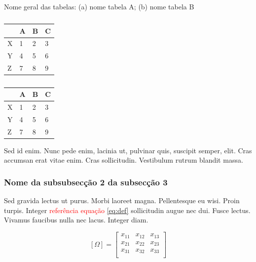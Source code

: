 \begin{table}[h]
    \centering
    \caption{Nome geral das tabelas: (a) nome tabela A; (b) nome tabela B}
    \begin{subtable}[h]{0.4\textwidth}
        \centering
        \caption{}
        \begin{tabular}{llll}
            \hline
              & A & B & C \\
            \hline
           X  & 1 & 2 & 3 \\
           Y  & 4 & 5 & 6 \\
           Z  & 7 & 8 & 9 \\
            \hline
        \end{tabular}
        \label{tab:tabA}
    \end{subtable}
    \begin{subtable}[h]{0.4\textwidth}
        \centering
        \caption{}
        \begin{tabular}{llll}
            \hline
              & A & B & C \\
            \hline
           X  & 1 & 2 & 3 \\
           Y  & 4 & 5 & 6 \\
           Z  & 7 & 8 & 9 \\
            \hline
        \end{tabular}
        \label{tab:tabB}
    \end{subtable}
    \label{tab:tabAB}
\end{table}

Sed id enim. Nunc pede enim, lacinia ut, pulvinar quis, suscipit semper, elit. Cras accumsan erat vitae enim. Cras sollicitudin. Vestibulum rutrum blandit massa.

\subsubsection{Nome da subsubsecção 2 da subsecção 3}
Sed gravida lectus ut purus. Morbi laoreet magna. Pellentesque eu wisi. Proin turpis. Integer \textcolor{red}{referência equação} \ref{eq:def} sollicitudin augue nec dui. Fusce lectus. Vivamus faucibus nulla nec lacus. Integer diam. 

\begin{equation}
    \label{eq:def}
    [\Omega] = 
    \left[
    \begin{array}{ccc}
        x_{11} & x_{12} & x_{13} \\
        x_{21} & x_{22} & x_{23} \\
        x_{31} & x_{32} & x_{33} \\
    \end{array}
    \right]
\end{equation}

